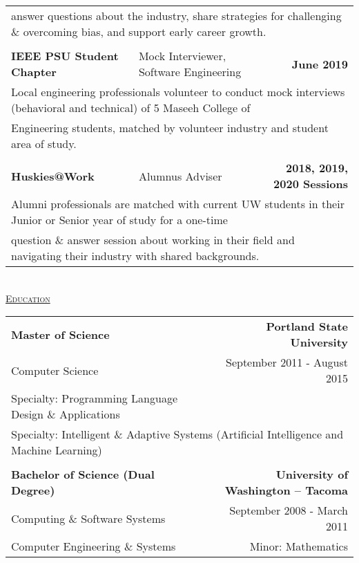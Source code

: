 \documentclass[letterpaper]{article}
\begin{document}
\begin{center}
\begin{tabular}{p{}p{}r}
			\\
				\multicolumn{3}{p{\textwidth}}{\quad\quad answer questions about the industry, share strategies for challenging \& overcoming bias, and support early career growth.} 
			\\
			\\ %
				\textbf{IEEE PSU Student Chapter}					&
				Mock Interviewer, Software Engineering							&
				\textbf{June 2019 \quad}
			\\
				\multicolumn{3}{p{\textwidth}}{\quad\quad Local engineering professionals volunteer to conduct mock interviews (behavioral and technical) of 5 Maseeh College of} 
			\\
				\multicolumn{3}{p{\textwidth}}{\quad\quad Engineering students, matched by volunteer industry and student area of study.} 
			\\
			\\ %
				\textbf{Huskies@Work}									&
				Alumnus Adviser										&
				\textbf{2018, 2019, 2020 Sessions \quad}
			\\
				\multicolumn{3}{p{\textwidth}}{\quad\quad Alumni professionals are matched with current UW students in their Junior or Senior year of study for a one-time} 
			\\
				\multicolumn{3}{p{\textwidth}}{\quad\quad question \& answer session about working in their field and navigating their industry with shared backgrounds.} 
			\\
		\end{tabular} \\
		\vspace{0.5in} %
		\underline{\large \scshape Education}
		\begin{tabular}{p{}r}
				\textbf{Master of Science}							&
				\textbf{Portland State University \quad}
			\\
				\quad Computer Science\quad				&
				{September 2011 - August 2015 \quad\quad}
			\\
				\quad Specialty: Programming Language Design \& Applications		&		{ \quad\quad}
			\\	
				\multicolumn{2}{p{\textwidth}}{\quad Specialty: Intelligent \& Adaptive Systems (Artificial Intelligence and Machine Learning)}
				
			\\
			\\
				\textbf{Bachelor of Science (Dual Degree)}			&
				\textbf{University of Washington -- Tacoma \quad}
			\\
				{\quad Computing \& Software Systems}						&
				{September 2008 - March 2011 \quad\quad}
			\\
				{\quad Computer Engineering \& Systems}						&
				{Minor: Mathematics \quad\quad}	
				

\end{tabular}
\end{center}
\end{document}
